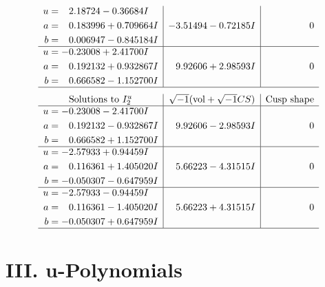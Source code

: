 \documentclass[1p]{elsarticle_modified}
\theoremstyle{definition}
\newcommand{\I}{\sqrt{-1}}
\begin{document}
$$\begin{array}{c|c|c}
\begin{aligned}
u &= \phantom{-}2.18724 - 0.36684 I \\
a &= \phantom{-}0.183996 + 0.709664 I \\
b &= \phantom{-}0.006947 - 0.845184 I\end{aligned}
 & -3.51494 - 0.72185 I & \phantom{-0.000000 } 0 \\ \hline\begin{aligned}
u &= -0.23008 + 2.41700 I \\
a &= \phantom{-}0.192132 + 0.932867 I \\
b &= \phantom{-}0.666582 - 1.152700 I\end{aligned}
 & \phantom{-}9.92606 + 2.98593 I & \phantom{-0.000000 } 0\\
 \hline 
 \end{array}$$\newpage$$\begin{array}{c|c|c}  
\text{Solutions to }I^u_{2}& \I (\text{vol} + \sqrt{-1}CS) & \text{Cusp shape}\\
 \hline 
\begin{aligned}
u &= -0.23008 - 2.41700 I \\
a &= \phantom{-}0.192132 - 0.932867 I \\
b &= \phantom{-}0.666582 + 1.152700 I\end{aligned}
 & \phantom{-}9.92606 - 2.98593 I & \phantom{-0.000000 } 0 \\ \hline\begin{aligned}
u &= -2.57933 + 0.94459 I \\
a &= \phantom{-}0.116361 + 1.405020 I \\
b &= -0.050307 - 0.647959 I\end{aligned}
 & \phantom{-}5.66223 - 4.31515 I & \phantom{-0.000000 } 0 \\ \hline\begin{aligned}
u &= -2.57933 - 0.94459 I \\
a &= \phantom{-}0.116361 - 1.405020 I \\
b &= -0.050307 + 0.647959 I\end{aligned}
 & \phantom{-}5.66223 + 4.31515 I & \phantom{-0.000000 } 0\\
 \hline 
 \end{array}$$\newpage
\newpage\renewcommand{\arraystretch}{1}
\centering \section*{ III. u-Polynomials}
\end{document}
